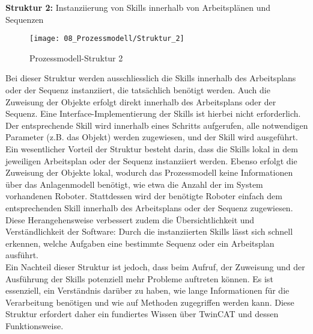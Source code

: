 		\textbf{Struktur 2:} Instanziierung von Skills innerhalb von Arbeitsplänen und Sequenzen
		\vspace{2mm} 
		\vspace{-5mm}
		\\
		\begin{wrapfigure}{r}{0.4\textwidth}
			\centering
			\texttt{[image: 08\_Prozessmodell/Struktur\_2]}
			\captionsetup{justification=centering}
			\caption{Prozessmodell-Struktur 2}
			\label{fig:Prozessmodell_Struktur_2}
		\end{wrapfigure} 
		Bei dieser Struktur werden ausschliesslich die Skills innerhalb des Arbeitsplans oder der Sequenz instanziiert, die tatsächlich benötigt werden. Auch die Zuweisung der Objekte erfolgt direkt innerhalb des Arbeitsplans oder der Sequenz. Eine Interface-Implementierung der Skills ist hierbei nicht erforderlich. Der entsprechende Skill wird innerhalb eines Schritts aufgerufen, alle notwendigen Parameter (z.B. das Objekt) werden zugewiesen, und der Skill wird ausgeführt.
		\\
		Ein wesentlicher Vorteil der Struktur besteht darin, dass die Skills lokal in dem jeweiligen Arbeitsplan oder der Sequenz instanziiert werden. Ebenso erfolgt die Zuweisung der Objekte lokal, wodurch das Prozessmodell keine Informationen über das Anlagenmodell benötigt, wie etwa die Anzahl der im System vorhandenen Roboter. Stattdessen wird der benötigte Roboter einfach dem entsprechenden Skill innerhalb des Arbeitsplans oder der Sequenz zugewiesen. Diese Herangehensweise verbessert zudem die Übersichtlichkeit und Verständlichkeit der Software: Durch die instanziierten Skills lässt sich schnell erkennen, welche Aufgaben eine bestimmte Sequenz oder ein Arbeitsplan ausführt.
		\\
		Ein Nachteil dieser Struktur ist jedoch, dass beim Aufruf, der Zuweisung und der Ausführung der Skills potenziell mehr Probleme auftreten können. Es ist essenziell, ein Verständnis darüber zu haben, wie lange Informationen für die Verarbeitung benötigen und wie auf Methoden zugegriffen werden kann. Diese Struktur erfordert daher ein fundiertes Wissen über TwinCAT und dessen Funktionsweise.
		
